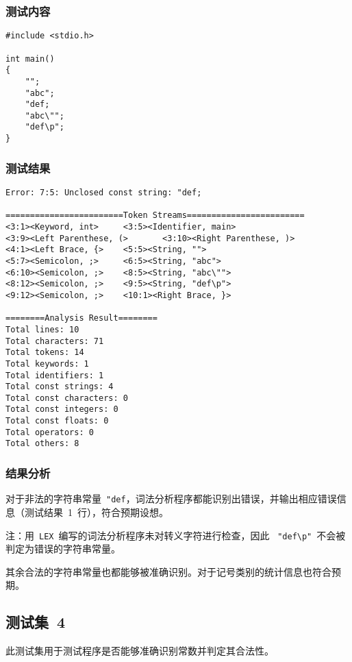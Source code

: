 \documentclass[lang=cn,11pt,a4paper]{paper}
\begin{document}
\subsubsection{测试内容}

\begin{lstlisting}
#include <stdio.h>

int main()
{
    "";
    "abc";
    "def;
    "abc\"";
    "def\p";
}
\end{lstlisting}

\subsubsection{测试结果}

\begin{lstlisting}
Error: 7:5: Unclosed const string: "def;

========================Token Streams========================
<3:1><Keyword, int>     <3:5><Identifier, main>
<3:9><Left Parenthese, (>       <3:10><Right Parenthese, )>
<4:1><Left Brace, {>    <5:5><String, "">
<5:7><Semicolon, ;>     <6:5><String, "abc">
<6:10><Semicolon, ;>    <8:5><String, "abc\"">
<8:12><Semicolon, ;>    <9:5><String, "def\p">
<9:12><Semicolon, ;>    <10:1><Right Brace, }>

========Analysis Result========
Total lines: 10
Total characters: 71
Total tokens: 14
Total keywords: 1
Total identifiers: 1
Total const strings: 4
Total const characters: 0
Total const integers: 0
Total const floats: 0
Total operators: 0
Total others: 8
\end{lstlisting}

\subsubsection{结果分析}

对于非法的字符串常量\ \lstinline{"def}，词法分析程序都能识别出错误，并输出相应错误信息（测试结果\ 1\ 行），符合预期设想。

注：用\ \lstinline{LEX}\ 编写的词法分析程序未对转义字符进行检查，因此 \ \lstinline{"def\p"}\ 不会被判定为错误的字符串常量。

其余合法的字符串常量也都能够被准确识别。对于记号类别的统计信息也符合预期。

\subsection{测试集\ 4}

此测试集用于测试程序是否能够准确识别常数并判定其合法性。
\end{document}
